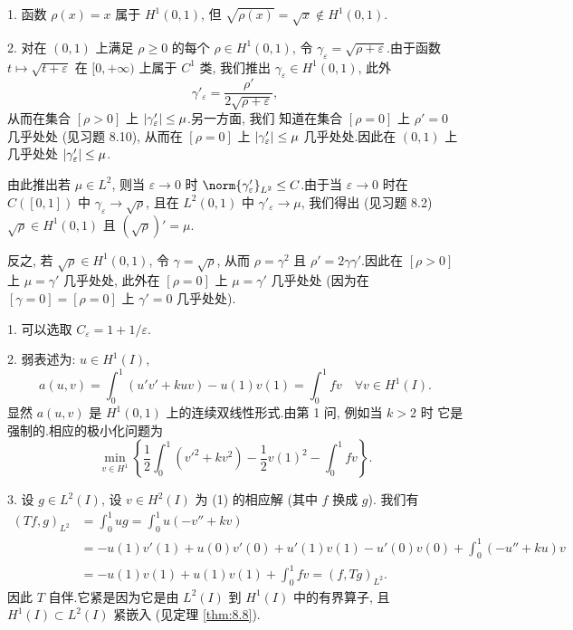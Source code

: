 
1. 函数 $\rho(x)=x$ 属于 $H^1(0,1)$, 但 $\sqrt{\rho(x)}=\sqrt{x}\notin H^1(0,1)$.

2. 对在 $(0,1)$ 上满足 $\rho\ge0$ 的每个 $\rho\in H^1(0,1)$, 令
$\gamma_\varepsilon=\sqrt{\rho+\varepsilon}$.由于函数 $t\mapsto\sqrt{t+\varepsilon}$
在 $[0,+\infty)$ 上属于 $C^1$ 类, 我们推出 $\gamma_\varepsilon\in H^1(0,1)$,
此外
\begin{equation*}
\gamma'_\varepsilon=\frac{\rho'}{2\sqrt{\rho+\varepsilon}},
\end{equation*}
从而在集合 $[\rho>0]$ 上 $\left|\gamma'_\varepsilon\right|\le\mu$.另一方面, 我们
知道在集合 $[\rho=0]$ 上 $\rho'=0$ 几乎处处 (见习题 8.10), 从而在 $[\rho=0]$
上 $\left|\gamma'_\varepsilon\right|\le\mu$ 几乎处处.因此在 $(0,1)$ 上几乎处处
$\left|\gamma'_\varepsilon\right|\le\mu$.

由此推出若 $\mu\in L^2$, 则当 $\varepsilon\to0$ 时
$\norm{\gamma'_\varepsilon}_{L^2}\le C$.由于当 $\varepsilon\to0$ 时在
$C([0,1])$ 中 $\gamma_\varepsilon\to\sqrt{\rho}$, 且在 $L^2(0,1)$ 中
$\gamma'_\varepsilon\to\mu$, 我们得出 (见习题 8.2) $\sqrt{\rho}\in H^1(0,1)$
且 $(\sqrt{\rho})'=\mu$.

反之, 若 $\sqrt{\rho}\in H^1(0,1)$, 令 $\gamma=\sqrt{\rho}$, 从而 $\rho=\gamma^2$
且 $\rho'=2\gamma\gamma'$.因此在 $[\rho>0]$ 上 $\mu=\gamma'$ 几乎处处,
此外在 $[\rho=0]$ 上 $\mu=\gamma'$ 几乎处处 (因为在 $[\gamma=0]=[\rho=0]$ 上
$\gamma'=0$ 几乎处处).


1. 可以选取 $C_\varepsilon=1+1/\varepsilon$.

2. 弱表述为: $u\in H^1(I)$,
\begin{equation*}
a(u,v)=\int_0^1(u'v'+kuv)-u(1)v(1)=\int_0^1fv\quad\forall v\in H^1(I).
\end{equation*}
显然 $a(u,v)$ 是 $H^1(0,1)$ 上的连续双线性形式.由第 1 问, 例如当 $k>2$ 时
它是强制的.相应的极小化问题为
\begin{equation*}
\min_{v\in H^1}\left\{\frac12\int_0^1(v'^2+kv^2)-\frac12v(1)^2-\int_0^1fv\right\}.
\end{equation*}

3. 设 $g\in L^2(I)$, 设 $v\in H^2(I)$ 为 (1) 的相应解 (其中 $f$ 换成 $g$).
我们有
\begin{align*}
(Tf,g)_{L^2}&=\int_0^1ug=\int_0^1u(-v''+kv)\\
&=-u(1)v'(1)+u(0)v'(0)+u'(1)v(1)-u'(0)v(0)+\int_0^1(-u''+ku)v\\
&=-u(1)v(1)+u(1)v(1)+\int_0^1fv=(f,Tg)_{L^2}.
\end{align*}
因此 $T$ 自伴.它紧是因为它是由 $L^2(I)$ 到 $H^1(I)$ 中的有界算子, 且
$H^1(I)\subset L^2(I)$ 紧嵌入 (见定理  \ref{thm:8.8}).


